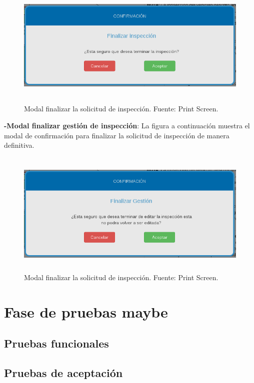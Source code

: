 \begin{figure}[H]
\begin{center}
	\includegraphics[width=14cm,height=6cm]{img/interfaces/modal_finalizar_inspeccion.png}
\end{center}
\caption{Modal finalizar la solicitud de inspección. Fuente: Print Screen.}
\label{fig:modal_finalizar_registro_dato_solicitud}
\end{figure}

\setlength{\parskip}{0mm}



\textbf{-Modal finalizar gestión de inspección}: La figura a continuación muestra el modal de confirmación para finalizar la solicitud de inspección de manera definitiva.

\begin{figure}[H]
\begin{center}
	\includegraphics[width=14cm,height=6cm]{img/interfaces/modal_finalizar_gestion.png}
\end{center}
\caption{Modal finalizar la solicitud de inspección. Fuente: Print Screen.}
\label{fig:modal_finalizar_gestion_dato_solicitud}
\end{figure}

\setlength{\parskip}{0mm}




\section{Fase de pruebas maybe } 
\setlength{\parskip}{5mm}
\setlength{\parskip}{0mm}


\subsection{Pruebas funcionales}
\setlength{\parskip}{5mm}
\setlength{\parskip}{0mm}

\subsection{Pruebas de aceptación}
\setlength{\parskip}{5mm}
\setlength{\parskip}{0mm}
